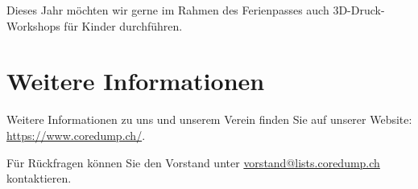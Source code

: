 \documentclass[10pt,a4paper,parskip,fleqn]{scrartcl}
\begin{document}
Dieses Jahr möchten wir gerne im Rahmen des Ferienpasses auch 3D-Druck-Workshops
für Kinder durchführen.

\section{Weitere Informationen}

Weitere Informationen zu uns und unserem Verein finden Sie auf unserer
Website:\\\url{https://www.coredump.ch/}.

Für Rückfragen können Sie den Vorstand unter \url{vorstand@lists.coredump.ch}
kontaktieren.


% 
% 

% 
% 
% 
\end{document}
